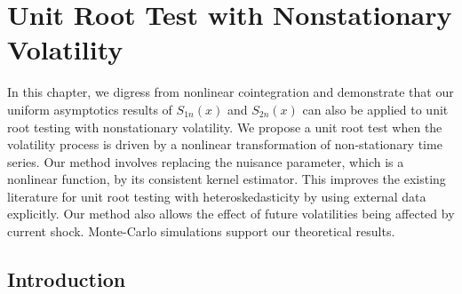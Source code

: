\chapter{Unit Root Test with Nonstationary Volatility} 
\ifpdf
    \graphicspath{{Chapter5/Chapter5Figs/PNG/}{Chapter5/Chapter5Figs/PDF/}{Chapter5/Chapter5Figs/}}
\else
    \graphicspath{{Chapter5/Chapter5Figs/EPS/}{Chapter5/Chapter5Figs/}}
\fi
In this chapter, we digress from nonlinear cointegration and demonstrate that our uniform asymptotics results of $S_{1n}(x)$ and $S_{2n}(x)$ can also be applied to unit root testing with nonstationary volatility. We propose a unit root test when the volatility process is driven by a nonlinear transformation of non-stationary time series. Our method involves replacing the nuisance parameter, which is a nonlinear function, by its consistent kernel estimator. This improves the existing literature for unit root testing with heteroskedasticity by using external data  explicitly. Our method also allows the effect of future volatilities being affected by current shock. Monte-Carlo simulations support our theoretical results.
\
\section{Introduction}



